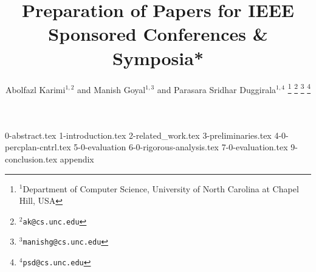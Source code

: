 \documentclass[letterpaper, 10 pt, conference]{ieeeconf}  %
\title{\LARGE \bf
Preparation of Papers for IEEE Sponsored Conferences \& Symposia*
}
\author{Abolfazl Karimi$^{1,2}$ and Manish Goyal$^{1, 3}$ and Parasara Sridhar Duggirala$^{1, 4}$%
\thanks{$^{1}$Department of Computer Science, University of North Carolina at Chapel Hill, USA}%
\thanks{$^{2}${\tt\small ak@cs.unc.edu}}%
\thanks{$^{3}${\tt\small manishg@cs.unc.edu}}%
\thanks{$^{4}${\tt\small psd@cs.unc.edu}}%
}
\begin{document}
\maketitle
\thispagestyle{empty}
\pagestyle{empty}

{0-abstract.tex}
{1-introduction.tex}
{2-related_work.tex}
{3-preliminaries.tex}
{4-0-percplan-cntrl.tex}
{5-0-evaluation}
{6-0-rigorous-analysis.tex}
{7-0-evaluation.tex}
{9-conclusion.tex}
{appendix}



\end{document}
